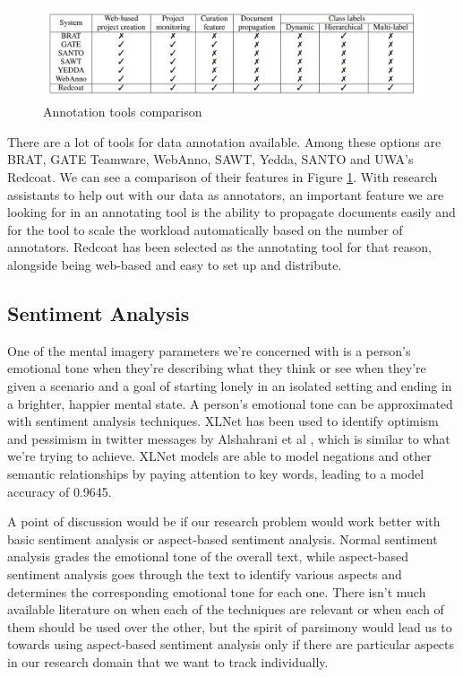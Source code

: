 \documentclass[12pt, a4paper]{article}
\begin{document}
\begin{figure}
	\includegraphics[scale=0.25]{annotating_tools}
	\caption{Annotation tools comparison}
	\label{annot_table}
\end{figure}

There are a lot of tools for data annotation available. Among these options are BRAT, GATE Teamware, WebAnno, SAWT, Yedda, SANTO and UWA's Redcoat. We can see a comparison of their features in Figure \ref{annot_table}. With research assistants to help out with our data as annotators, an important feature we are looking for in an annotating tool is the ability to propagate documents easily and for the tool to scale the workload automatically based on the number of annotators.  Redcoat \cite{stewart-etal-2019-redcoat} has been selected as the annotating tool for that reason, alongside being web-based and easy to set up and distribute. 

\subsection{Sentiment Analysis}
One of the mental imagery parameters we're concerned with is a person's emotional tone when they're describing what they think or see when they're given a scenario and a goal of starting lonely in an isolated setting and ending in a brighter, happier mental state. A person's emotional tone can be approximated with sentiment analysis techniques. XLNet has been used to identify optimism and pessimism in twitter messages by Alshahrani et al \cite{alshahrani2019xlnet}, which is similar to what we're trying to achieve. XLNet models are able to model negations and other semantic relationships by paying attention to key words, leading to a model accuracy of 0.9645. 

A point of discussion would be if our research problem would work better with basic sentiment analysis or aspect-based sentiment analysis. Normal sentiment analysis grades the emotional tone of the overall text, while aspect-based sentiment analysis goes through the text to identify various aspects and determines the corresponding emotional tone for each one. There isn't much available literature on when each of the techniques are relevant or when each of them should be used over the other, but the spirit of parsimony would lead us to towards using aspect-based sentiment analysis only if there are particular aspects in our research domain that we want to track individually. 
\end{document}
